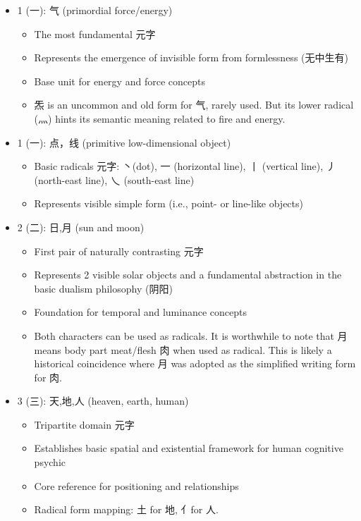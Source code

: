 \documentclass[
  11pt,
  letterpaper,
]{article}
\providecommand{\tightlist}{%
  \setlength{\itemsep}{0pt}\setlength{\parskip}{0pt}}
\begin{document}
\begin{itemize}
\tightlist
\item
  1 (一): 气 (primordial force/energy)

  \begin{itemize}
  \tightlist
  \item
    The most fundamental 元字
  \item
    Represents the emergence of invisible form from formlessness
    (无中生有)
  \item
    Base unit for energy and force concepts
  \item
    炁 is an uncommon and old form for 气, rarely used. But its lower
    radical (灬) hints its semantic meaning related to fire and energy.
  \end{itemize}
\item
  1 (一): 点，线 (primitive low-dimensional object)

  \begin{itemize}
  \tightlist
  \item
    Basic radicals 元字: 丶(dot), 一 (horizontal line), 丨 (vertical
    line), 丿 (north-east line), 乀 (south-east line)
  \item
    Represents visible simple form (i.e., point- or line-like objects)
  \end{itemize}
\item
  2 (二): 日,月 (sun and moon)

  \begin{itemize}
  \tightlist
  \item
    First pair of naturally contrasting 元字
  \item
    Represents 2 visible solar objects and a fundamental abstraction in
    the basic dualism philosophy (阴阳)
  \item
    Foundation for temporal and luminance concepts
  \item
    Both characters can be used as radicals. It is worthwhile to note
    that 月 means body part meat/flesh 肉 when used as radical. This is
    likely a historical coincidence where 月 was adopted as the
    simplified writing form for 肉.
  \end{itemize}
\item
  3 (三): 天,地,人 (heaven, earth, human)

  \begin{itemize}
  \tightlist
  \item
    Tripartite domain 元字
  \item
    Establishes basic spatial and existential framework for human
    cognitive psychic
  \item
    Core reference for positioning and relationships
  \item
    Radical form mapping: 土 for 地, 亻for 人.
  \end{itemize}
\end{itemize}
\end{document}
